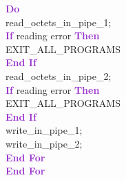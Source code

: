 \documentclass[11pt]{sample}
\renewcommand{\algorithmicdo}      {\textcolor{DarkOrchid}{\textbf{Do}}}
\renewcommand{\algorithmicif}      {\textbf{\textcolor{DarkOrchid}{If}}}
\renewcommand{\algorithmicendif}   {\textcolor{DarkOrchid}{\textbf{End If}}}
\renewcommand{\algorithmicthen}    {\textcolor{DarkOrchid}{\textbf{Then}}}
\renewcommand{\algorithmicdo}      {\textbf{\textcolor{DarkOrchid}{Do}}}
\renewcommand{\algorithmicendfor}  {\textbf{\textcolor{DarkOrchid}{End For}}}
\begin{document}
\begin{algorithm}
\begin{algorithmic}
    \algorithmicdo{\\}
    \hspace{7mm}read\_octets\_in\_pipe\_1;\\  \hspace{7mm}
    \algorithmicif{ reading error   }\algorithmicthen{\\\hspace{12mm}EXIT\_ALL\_PROGRAMS\\}
    \hspace{8mm}\algorithmicendif\\
    \hspace{9mm}read\_octets\_in\_pipe\_2;\\\hspace{7mm}
    \algorithmicif{ reading error   }\algorithmicthen{\\\hspace{12mm}EXIT\_ALL\_PROGRAMS\\}
    \hspace{8mm}\algorithmicendif\\
    \hspace{7mm}write\_in\_pipe\_1;\\
    \hspace{7mm}write\_in\_pipe\_2;\\
    \hspace{4mm}\algorithmicendfor\\
    \algorithmicendfor
  \end{algorithmic}
\end{algorithm}
\end{document}
